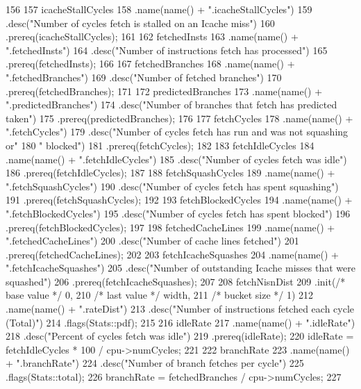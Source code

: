 \begin{DoxyCode}
156 {
157     icacheStallCycles
158         .name(name() + ".icacheStallCycles")
159         .desc("Number of cycles fetch is stalled on an Icache miss")
160         .prereq(icacheStallCycles);
161 
162     fetchedInsts
163         .name(name() + ".fetchedInsts")
164         .desc("Number of instructions fetch has processed")
165         .prereq(fetchedInsts);
166 
167     fetchedBranches
168         .name(name() + ".fetchedBranches")
169         .desc("Number of fetched branches")
170         .prereq(fetchedBranches);
171 
172     predictedBranches
173         .name(name() + ".predictedBranches")
174         .desc("Number of branches that fetch has predicted taken")
175         .prereq(predictedBranches);
176 
177     fetchCycles
178         .name(name() + ".fetchCycles")
179         .desc("Number of cycles fetch has run and was not squashing or"
180               " blocked")
181         .prereq(fetchCycles);
182 
183     fetchIdleCycles
184         .name(name() + ".fetchIdleCycles")
185         .desc("Number of cycles fetch was idle")
186         .prereq(fetchIdleCycles);
187 
188     fetchSquashCycles
189         .name(name() + ".fetchSquashCycles")
190         .desc("Number of cycles fetch has spent squashing")
191         .prereq(fetchSquashCycles);
192 
193     fetchBlockedCycles
194         .name(name() + ".fetchBlockedCycles")
195         .desc("Number of cycles fetch has spent blocked")
196         .prereq(fetchBlockedCycles);
197 
198     fetchedCacheLines
199         .name(name() + ".fetchedCacheLines")
200         .desc("Number of cache lines fetched")
201         .prereq(fetchedCacheLines);
202 
203     fetchIcacheSquashes
204         .name(name() + ".fetchIcacheSquashes")
205         .desc("Number of outstanding Icache misses that were squashed")
206         .prereq(fetchIcacheSquashes);
207 
208     fetchNisnDist
209         .init(/* base value */ 0,
210               /* last value */ width,
211               /* bucket size */ 1)
212         .name(name() + ".rateDist")
213         .desc("Number of instructions fetched each cycle (Total)")
214         .flags(Stats::pdf);
215 
216     idleRate
217         .name(name() + ".idleRate")
218         .desc("Percent of cycles fetch was idle")
219         .prereq(idleRate);
220     idleRate = fetchIdleCycles * 100 / cpu->numCycles;
221 
222     branchRate
223         .name(name() + ".branchRate")
224         .desc("Number of branch fetches per cycle")
225         .flags(Stats::total);
226     branchRate = fetchedBranches / cpu->numCycles;
227 
}
\end{DoxyCode}

